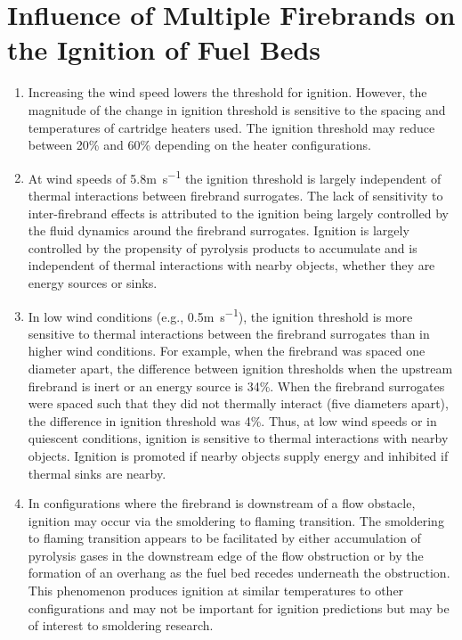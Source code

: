 \section{Influence of Multiple Firebrands on the Ignition of Fuel Beds}
        \begin{enumerate}
            \item Increasing the wind speed lowers the threshold for ignition. However, the magnitude of the change in ignition threshold is sensitive to the spacing and temperatures of cartridge heaters used. The ignition threshold may reduce between 20\% and 60\% depending on the heater configurations.
            
            \item At wind speeds of 5.8\si{\meter\per\second} the ignition threshold is largely independent of thermal interactions between firebrand surrogates. The lack of sensitivity to inter-firebrand effects is attributed to the ignition being largely controlled by the fluid dynamics around the firebrand surrogates. Ignition is largely controlled by the propensity of pyrolysis products to accumulate and is independent of thermal interactions with nearby objects, whether they are energy sources or sinks. 
            
            \item In low wind conditions (e.g., 0.5\si{\meter\per\second}), the ignition threshold is more sensitive to thermal interactions between the firebrand surrogates than in higher wind conditions. For example, when the firebrand was spaced one diameter apart, the difference between ignition thresholds when the upstream firebrand is inert or an energy source is 34\%. When the firebrand surrogates were spaced such that they did not thermally interact (five diameters apart), the difference in ignition threshold was 4\%. Thus, at low wind speeds or in quiescent conditions, ignition is sensitive to thermal interactions with nearby objects. Ignition is promoted if nearby objects supply energy and inhibited if thermal sinks are nearby. 
            
            \item In configurations where the firebrand is downstream of a flow obstacle, ignition may occur via the smoldering to flaming transition. The smoldering to flaming transition appears to be facilitated by either accumulation of pyrolysis gases in the downstream edge of the flow obstruction or by the formation of an overhang as the fuel bed recedes underneath the obstruction. This phenomenon produces ignition at similar temperatures to other configurations and may not be important for ignition predictions but may be of interest to smoldering research. 
        \end{enumerate}
